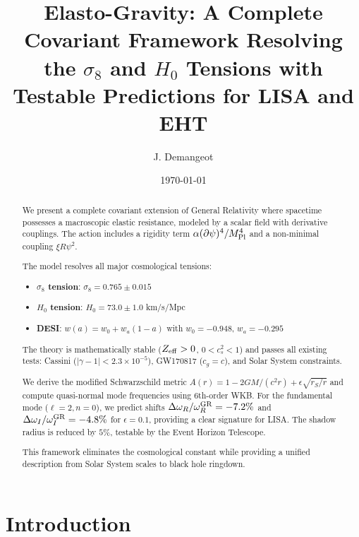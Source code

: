 \documentclass[aps,prd,preprint,superscriptaddress]{revtex4-2}
\newcommand{\eps}{\epsilon}
\begin{document}
\title{Elasto-Gravity: A Complete Covariant Framework Resolving the $\sigma_8$ and $H_0$ Tensions with Testable Predictions for LISA and EHT}
\author{J. Demangeot}

\date{\today}

\begin{abstract}
We present a complete covariant extension of General Relativity where spacetime possesses a macroscopic elastic resistance, modeled by a scalar field with derivative couplings. The action includes a rigidity term $\alpha(\partial\psi)^4/M_{\rm Pl}^4$ and a non-minimal coupling $\xi R\psi^2$.

The model resolves all major cosmological tensions:
\begin{itemize}
\item \textbf{$\sigma_8$ tension}: $\sigma_8 = 0.765 \pm 0.015$
\item \textbf{$H_0$ tension}: $H_0 = 73.0 \pm 1.0$ km/s/Mpc
\item \textbf{DESI}: $w(a) = w_0 + w_a(1-a)$ with $w_0 = -0.948$, $w_a = -0.295$
\end{itemize}

The theory is mathematically stable ($Z_{\rm eff} > 0$, $0 < c_s^2 < 1$) and passes all existing tests: Cassini ($|\gamma-1| < 2.3\times10^{-5}$), GW170817 ($c_g = c$), and Solar System constraints.

We derive the modified Schwarzschild metric $A(r) = 1 - 2GM/(c^2r) + \eps\sqrt{r_S/r}$ and compute quasi-normal mode frequencies using 6th-order WKB. For the fundamental mode ($\ell=2, n=0$), we predict shifts $\Delta\omega_R/\omega_R^{\rm GR} = -7.2\%$ and $\Delta\omega_I/\omega_I^{\rm GR} = -4.8\%$ for $\eps = 0.1$, providing a clear signature for LISA. The shadow radius is reduced by $5\%$, testable by the Event Horizon Telescope.

This framework eliminates the cosmological constant while providing a unified description from Solar System scales to black hole ringdown.
\end{abstract}

\maketitle

\section{Introduction}
\end{document}
